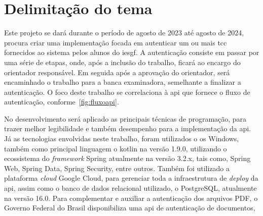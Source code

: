 \section{Delimitação do tema}\label{sec:delimitacao-do-tema}

Este projeto se dará durante o período de agosto de 2023 até agosto
de 2024, procura criar uma implementação focada em autenticar um ou
mais \acrfull{tcc} fornecidos ao sistema pelos alunos do
\acrfull{iesgf}.
A autenticação consiste em passar por uma série de etapas,
onde, após a inclusão do trabalho, ficará ao encargo do orientador
responsável.
Em seguida após a aprovação do orientador, será encaminhado o trabalho
para a banca examinadora, semelhante a finalizar a autenticação.
O foco deste trabalho se correlaciona à \acrshort{api} que fornece o
fluxo de autenticação, conforme~\ref{fig:fluxoapi}.

No desenvolvimento será aplicado as principais técnicas de
programação, para trazer melhor legibilidade e também desempenho
para a implementação da \acrshort{api}.
Já as tecnologias envolvidas neste trabalho, foram utilizados o \acrfull{os}
Windows, também como principal linguagem o \acrfull{kotlin} na
versão 1.9.0, utilizando o ecossistema do \textit{framework} Spring
atualmente na versão 3.2.x, tais como, Spring Web, Spring Data,
Spring Security, entre outros.
Também foi utilizado a plataforma \textit{cloud} Google Cloud, para
gerenciar toda a infraestrutura de \textit{deploy} da \acrshort{api},
assim como o banco de dados relacional utilizado, o PostgreSQL,
atualmente na versão 16.0.
Para complementar e auxiliar a autenticação dos arquivos PDF, o
Governo Federal do Brasil disponibiliza uma \acrshort{api} de
autenticação de documentos, 

